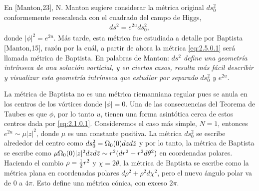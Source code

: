 En [Manton,23], N. Manton sugiere considerar la métrica original $ds_0^2$ conformemente reescaleada con el cuadrado del campo de Higgs,
\begin{align}
    ds^2 = e^{2u}ds_0^2,\label{eq:2.5.0.1}
\end{align}
donde $|\phi|^2=e^{2u}$. Más tarde, esta métrica fue estudiada a detalle por Baptista [Manton,15], razón por la cuál, a partir de ahora la métrica \eqref{eq:2.5.0.1} será llamada métrica de Baptista. En palabras de Manton: \emph{$ds^2$ define una geometría intrínseca de una solución vorticial, y en ciertos casos, resulta más fácil describir y visualizar esta geometría intrínseca que estudiar por separado $ds_0^2$ y $e^{2u}$}.

La métrica de Baptista no es una métrica riemanniana regular pues se anula en los centros de los vórtices donde $|\phi|=0$. Una de las consecuencias del Teorema de Taubes es que $\phi$, por lo tanto $u$, tienen una forma asintótica cerca de estos centros dada por \eqref{eq:2.1.0.1}. Consideremos el caso más simple, $N=1$, entonces $e^{2u}\sim\mu|z|^2$, donde $\mu$ es una constante positiva. La métrica $ds_0^2$ se escribe alrededor del centro como $ds_0^2=\Omega_0(0)dzd\bar z$ y por lo tanto, la métrica de Baptista se escribe como $\mu\Omega_0(0)|z|^2dzd\bar z\sim r^2(dr^2+r^2d\theta^2)$ en coordenadas polares. Haciendo el cambio $\rho=\frac{1}{2} r^2$ y $\chi=2\theta$, la métrica de Baptista se escribe como la métrica plana en coordenadas polares $d\rho^2+\rho^2d\chi^2$, pero el nuevo ángulo polar va de $0$ a $4\pi$. Esto define una métrica cónica, con exceso $2\pi$.

